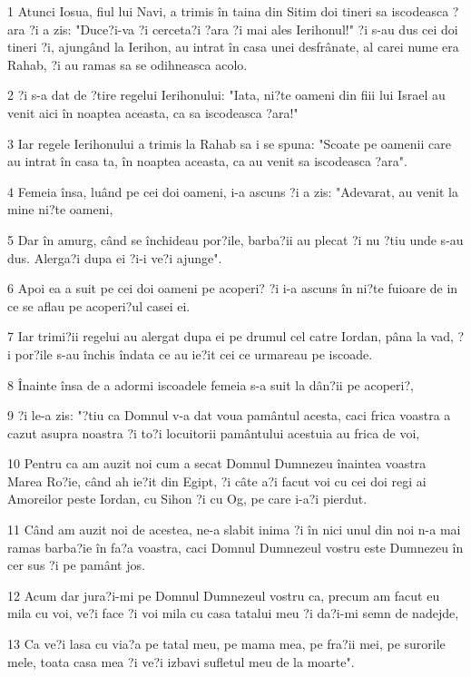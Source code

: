 \par 1 Atunci Iosua, fiul lui Navi, a trimis în taina din Sitim doi tineri sa iscodeasca ?ara ?i a zis: "Duce?i-va ?i cerceta?i ?ara ?i mai ales Ierihonul!" ?i s-au dus cei doi tineri ?i, ajungând la Ierihon, au intrat în casa unei desfrânate, al carei nume era Rahab, ?i au ramas sa se odihneasca acolo.
\par 2 ?i s-a dat de ?tire regelui Ierihonului: "Iata, ni?te oameni din fiii lui Israel au venit aici în noaptea aceasta, ca sa iscodeasca ?ara!"
\par 3 Iar regele Ierihonului a trimis la Rahab sa i se spuna: "Scoate pe oamenii care au intrat în casa ta, în noaptea aceasta, ca au venit sa iscodeasca ?ara".
\par 4 Femeia însa, luând pe cei doi oameni, i-a ascuns ?i a zis: "Adevarat, au venit la mine ni?te oameni,
\par 5 Dar în amurg, când se închideau por?ile, barba?ii au plecat ?i nu ?tiu unde s-au dus. Alerga?i dupa ei ?i-i ve?i ajunge".
\par 6 Apoi ea a suit pe cei doi oameni pe acoperi? ?i i-a ascuns în ni?te fuioare de in ce se aflau pe acoperi?ul casei ei.
\par 7 Iar trimi?ii regelui au alergat dupa ei pe drumul cel catre Iordan, pâna la vad, ?i por?ile s-au închis îndata ce au ie?it cei ce urmareau pe iscoade.
\par 8 Înainte însa de a adormi iscoadele femeia s-a suit la dân?ii pe acoperi?,
\par 9 ?i le-a zis: "?tiu ca Domnul v-a dat voua pamântul acesta, caci frica voastra a cazut asupra noastra ?i to?i locuitorii pamântului acestuia au frica de voi,
\par 10 Pentru ca am auzit noi cum a secat Domnul Dumnezeu înaintea voastra Marea Ro?ie, când ah ie?it din Egipt, ?i câte a?i facut voi cu cei doi regi ai Amoreilor peste Iordan, cu Sihon ?i cu Og, pe care i-a?i pierdut.
\par 11 Când am auzit noi de acestea, ne-a slabit inima ?i în nici unul din noi n-a mai ramas barba?ie în fa?a voastra, caci Domnul Dumnezeul vostru este Dumnezeu în cer sus ?i pe pamânt jos.
\par 12 Acum dar jura?i-mi pe Domnul Dumnezeul vostru ca, precum am facut eu mila cu voi, ve?i face ?i voi mila cu casa tatalui meu ?i da?i-mi semn de nadejde,
\par 13 Ca ve?i lasa cu via?a pe tatal meu, pe mama mea, pe fra?ii mei, pe surorile mele, toata casa mea ?i ve?i izbavi sufletul meu de la moarte".
